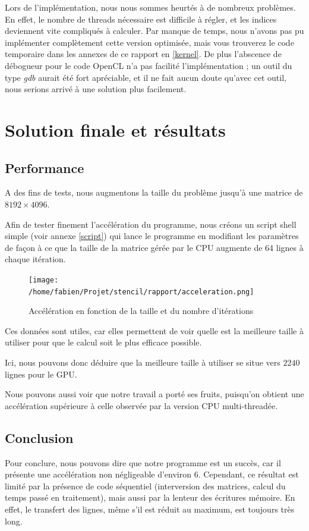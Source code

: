 \documentclass{article}
\begin{document}
Lors de l'implémentation, nous nous sommes heurtés à de nombreux
problèmes. En effet, le nombre de threads nécessaire est difficile à
régler, et les indices deviennent vite compliqués à calculer.  Par
manque de temps, nous n'avons pas pu implémenter complètement cette
version optimisée, mais vous trouverez le code temporaire dans les
annexes de ce rapport en \ref{kernel}.  De plus l'abscence de
débogueur pour le code OpenCL n'a pas facilité l'implémentation ; un
outil du type \textit{gdb} aurait été fort apréciable, et il ne fait
aucun doute qu'avec cet outil, nous serions arrivé à une solution plus
facilement.

\section{Solution finale et résultats}
\subsection{Performance}
A des fins de tests, nous augmentons la taille du problème jusqu'à une
matrice de $8192\times4096$.

Afin de tester finement l'accélération du programme, nous créons un
script shell simple (voir annexe \ref{script}) qui lance le programme
en modifiant les paramètres de façon à ce que la taille de la matrice
gérée par le CPU augmente de 64 lignes à chaque itération.

\begin{figure}[htp]
\texttt{[image: /home/fabien/Projet/stencil/rapport/acceleration.png]}
\caption{Accélération en fonction de la taille et du nombre d'itérations}
\label{acceleration}
\end{figure}

Ces données sont utiles, car elles permettent de voir quelle est la
meilleure taille à utiliser pour que le calcul soit le plus efficace
possible.

Ici, nous pouvons donc déduire que la meilleure taille à utiliser se
situe vers $2240$ lignes pour le GPU.

Nous pouvons aussi voir que notre travail a porté ses fruits,
puisqu'on obtient une accélération supérieure à celle observée par la
version CPU multi-threadée.

\subsection{Conclusion}
Pour conclure, nous pouvons dire que notre programme est un succès,
car il présente une accélération non négligeable d'environ 6.
Cependant, ce résultat est limité par la présence de code séquentiel
(interversion des matrices, calcul du temps passé en traitement), mais
aussi par la lenteur des écritures mémoire. En effet, le transfert des
lignes, même s'il est réduit au maximum, est toujours très long.
\end{document}
